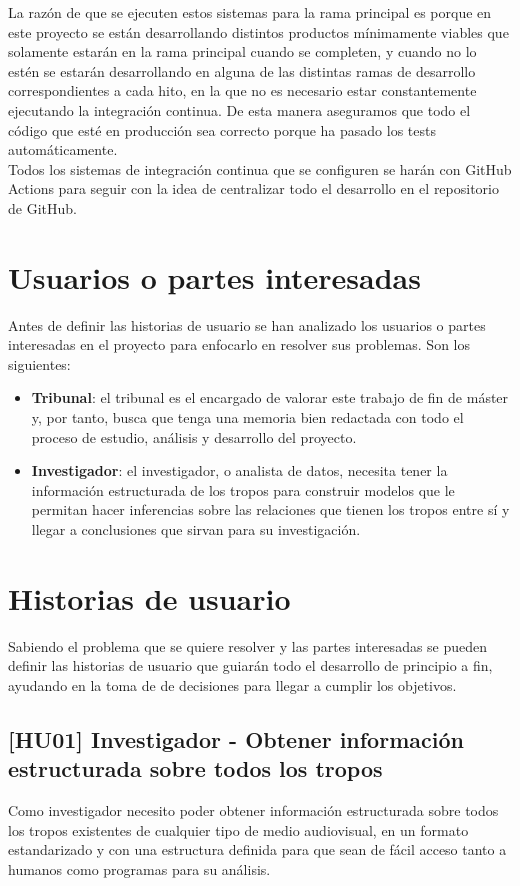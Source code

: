 La razón de que se ejecuten estos sistemas para la rama principal es porque en este proyecto se están desarrollando distintos productos mínimamente viables que solamente estarán en la rama principal cuando se completen, y cuando no lo estén se estarán desarrollando en alguna de las distintas ramas de desarrollo correspondientes a cada hito, en la que no es necesario estar constantemente ejecutando la integración continua. De esta manera aseguramos que todo el código que esté en producción sea correcto porque ha pasado los tests automáticamente.\\

Todos los sistemas de integración continua que se configuren se harán con GitHub Actions para seguir con la idea de centralizar todo el desarrollo en el repositorio de GitHub.

\section{Usuarios o partes interesadas}
Antes de definir las historias de usuario se han analizado los usuarios o partes interesadas en el proyecto para enfocarlo en resolver sus problemas. Son los siguientes:
\begin{itemize}
    \item \textbf{Tribunal}: el tribunal es el encargado de valorar este trabajo de fin de máster y, por tanto, busca que tenga una memoria bien redactada con todo el proceso de estudio, análisis y desarrollo del proyecto.
    \item \textbf{Investigador}: el investigador, o analista de datos, necesita tener la información estructurada de los tropos para construir modelos que le permitan hacer inferencias sobre las relaciones que tienen los tropos entre sí y llegar a conclusiones que sirvan para su investigación.
\end{itemize}

\section{Historias de usuario}
Sabiendo el problema que se quiere resolver y las partes interesadas se pueden definir las historias de usuario que guiarán todo el desarrollo de principio a fin, ayudando en la toma de de decisiones para llegar a cumplir los objetivos.

\subsection{[HU01] Investigador - Obtener información estructurada sobre todos los tropos}
Como investigador necesito poder obtener información estructurada sobre todos los tropos existentes de cualquier tipo de medio audiovisual, en un formato estandarizado y con una estructura definida para que sean de fácil acceso tanto a humanos como programas para su análisis.

